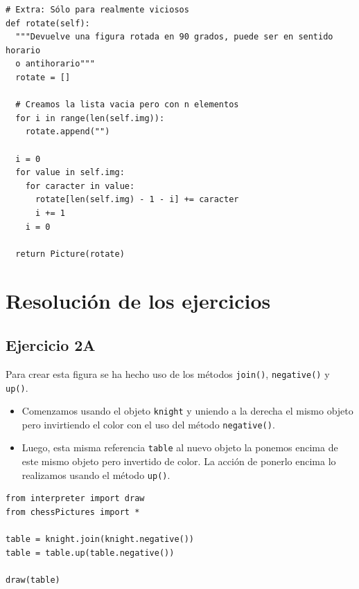 \documentclass[10pt, a4paper]{article}
\newcommand{\mintpython}[1]{\texttt{#1}}
\begin{document}
\begin{verbatim}
# Extra: Sólo para realmente viciosos
def rotate(self):
  """Devuelve una figura rotada en 90 grados, puede ser en sentido horario
  o antihorario"""
  rotate = []

  # Creamos la lista vacia pero con n elementos
  for i in range(len(self.img)):
    rotate.append("")

  i = 0
  for value in self.img:
    for caracter in value:
      rotate[len(self.img) - 1 - i] += caracter
      i += 1
    i = 0

  return Picture(rotate)
\end{verbatim}

\section{Resolución de los ejercicios}
\subsection{Ejercicio 2A}
Para crear esta figura se ha hecho uso de los métodos \mintpython{join()}, \mintpython{negative()} y \mintpython{up()}. 

\begin{itemize}
  \item Comenzamos usando el objeto \mintpython{knight} y uniendo a la derecha el mismo objeto pero invirtiendo el color con el uso del método \mintpython{negative()}.
  \item Luego, esta misma referencia \mintpython{table} al nuevo objeto la ponemos encima de este mismo objeto pero invertido de color. La acción de ponerlo encima lo realizamos usando el método \mintpython{up()}.
\end{itemize}

\begin{verbatim}
from interpreter import draw
from chessPictures import *

table = knight.join(knight.negative())
table = table.up(table.negative())

draw(table)
\end{verbatim}
\end{document}
